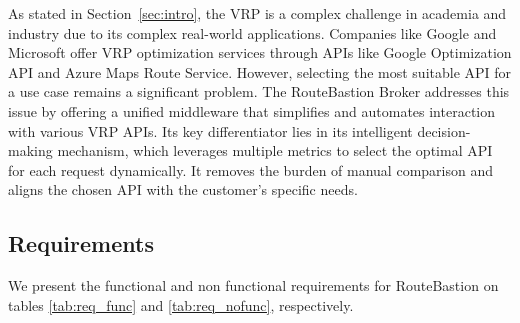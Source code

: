 
As stated in Section~\ref{sec:intro}, the VRP is a complex challenge in academia and industry due to its complex real-world applications. Companies like Google and Microsoft offer VRP optimization services through APIs like Google Optimization API and Azure Maps Route Service. However, selecting the most suitable API for a use case remains a significant problem. The RouteBastion Broker addresses this issue by offering a unified middleware that simplifies and automates interaction with various VRP APIs. Its key differentiator lies in its intelligent decision-making mechanism, which leverages multiple metrics to select the optimal API for each request dynamically. It removes the burden of manual comparison and aligns the chosen API with the customer's specific needs.

\subsection{Requirements}

We present the functional and non functional requirements for RouteBastion on tables \ref{tab:req_func} and \ref{tab:req_nofunc}, respectively.


